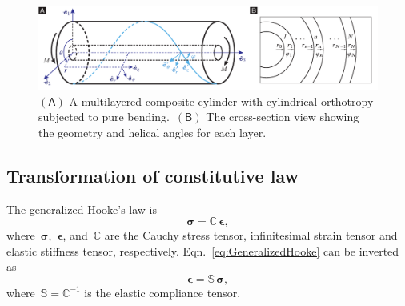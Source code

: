 \documentclass[preprint,10pt,times]{elsarticle}
\numberwithin{equation}{section}
\renewcommand{\u}[1]{\boldsymbol{#1}}
\newcommand{\pr}[1]{\left( #1 \right)}
\newcommand{\subf}[1]{\pr{\textsf{#1}}}
\renewcommand{\>}{$\Rightarrow$}
\begin{document}
\begin{figure}[t]
	\centering
	\graphicspath{{../LyxFiles/figure/}}
	\includegraphics[width=1\textwidth]{schematic.pdf}
	\caption{$\subf{A}$ A multilayered composite cylinder with cylindrical orthotropy subjected to pure bending.~$\subf{B}$ The cross-section view showing the geometry and helical angles for each layer.}
	\label{fig:schematic}
\end{figure}

\subsection{Transformation of constitutive law}
\label{sec:MatrixTrans}
The generalized Hooke's law is
\begin{equation}
\u{\sigma} = \mathbb{C}\, \u{\epsilon},
\label{eq:GeneralizedHooke}
\end{equation}
where~$\u{\sigma}$,~$\u{\epsilon}$, and~$\mathbb{C}$ are the Cauchy stress tensor, infinitesimal strain tensor and elastic stiffness tensor, respectively. Eqn.~\eqref{eq:GeneralizedHooke} can be inverted as
\begin{equation}
 \u{\epsilon} = \mathbb{S}\, \u{\sigma},
\label{eq:GeneralizedHookeInverse}
\end{equation}
where~$\mathbb{S} = \mathbb{C}^{-1}$ is the elastic compliance tensor.
\end{document}
